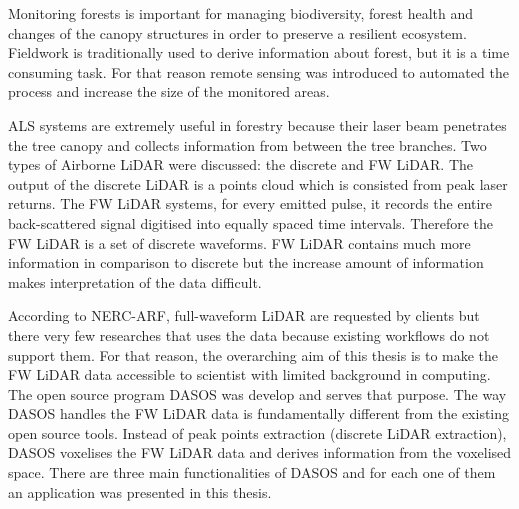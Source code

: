 \documentclass{subfiles}
\begin{document}
\par Monitoring forests is important for managing biodiversity, forest health and changes of the canopy structures in order to preserve a resilient ecosystem. Fieldwork is traditionally used to derive information about forest, but it is a time consuming task. For that reason remote sensing was introduced to automated the process and increase the size of the monitored areas. 

\par ALS systems are extremely useful in forestry because their laser beam penetrates the tree canopy and collects information from between the tree branches. Two types of Airborne LiDAR were discussed: the discrete and FW LiDAR. The output of the discrete LiDAR is a points cloud which is consisted from peak laser returns. The FW LiDAR systems, for every emitted pulse, it records the entire back-scattered signal digitised into equally spaced time intervals. Therefore the FW LiDAR is a set of discrete waveforms. FW LiDAR contains much more information in comparison to discrete but the increase amount of information makes interpretation of the data difficult. 

\par According to NERC-ARF, full-waveform LiDAR are requested by clients but there very few researches that uses the data because existing workflows do not support them. For that reason, the overarching aim of this thesis is to make the FW LiDAR data accessible to scientist with limited background in computing. The open source program DASOS was develop and serves that purpose. The way DASOS handles the FW LiDAR data is fundamentally different from the existing open source tools. Instead of peak points extraction (discrete LiDAR extraction), DASOS voxelises the FW LiDAR data and derives information from the voxelised space. There are three main functionalities of DASOS and for each one of them an application was presented in this thesis.  
\end{document}
